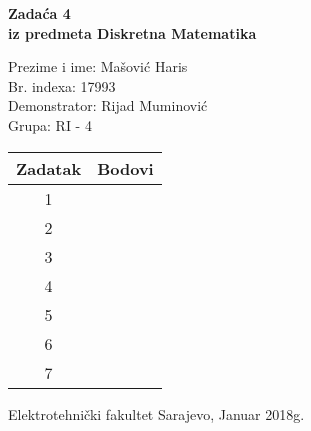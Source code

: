 \documentclass[12pt]{article}
\newcommand{\prezimeIme}{Mašović Haris}
\newcommand{\brIndexa}{17993}
\newcommand{\brZadace}{4}
\begin{document}
    
    \thispagestyle{empty}
    \begin{center}
      \vspace*{1cm}

      \vspace*{2cm}
      {\huge \bf Zadaća \brZadace } \\
      \vspace*{1cm}
      {\Large \bf iz predmeta Diskretna Matematika}

      \vspace*{1.25cm}

      {\Large Prezime i ime: \prezimeIme} \\
      \vspace*{0.5cm}
      {\Large Br. indexa: \brIndexa} \\
      \vspace*{0.5cm}
      {\Large Demonstrator: Rijad Muminović} \\
      \vspace*{0.5cm}
      {\Large Grupa: RI - 4} \\ 
      
      \vspace*{2cm}
      \renewcommand{\arraystretch}{1.75}
      \begin{tabular}{|c|c|}
    	\hline Zadatak & Bodovi \\
    	\hline 1 &  \\
    	\hline 2 &  \\
    	\hline 3 &  \\
    	\hline 4 &  \\
    	\hline 5 &  \\
    	\hline 6 &  \\
    	\hline 7 &  \\
    	\hline
     \end{tabular}

      \vfill


      {\large Elektrotehnički fakultet Sarajevo, Januar 2018g.}

    \end{center}
    \newpage
    \thispagestyle{empty}
    
\end{document}

